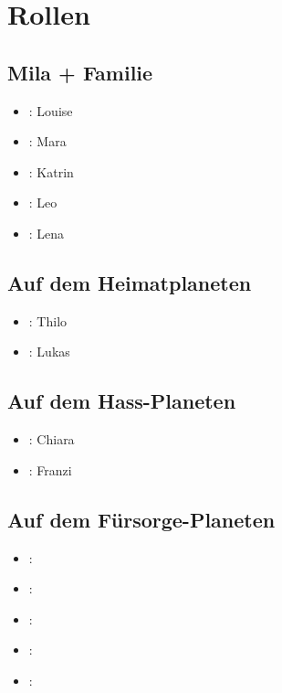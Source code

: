\pagebreak

\section{Rollen}
\begin{multicols}{2}
\subsection{Mila + Familie}
\begin{itemize}
\item \milamh: Louise
\item \miladh: Mara
\item \mutterh: Katrin
\item \leonh: Leo
\item \lenah: Lena
\end{itemize}

\subsection{Auf dem Heimatplaneten}
\begin{itemize}
\item \alberth: Thilo
\item \theoh: Lukas
\end{itemize}

\subsection{Auf dem Hass-Planeten}
\begin{itemize}
\item \wilmah: Chiara
\item \wilhelminah: Franzi
\end{itemize}

\subsection{Auf dem Fürsorge-Planeten}
\begin{itemize}
\item \charlotteh:
\item \sophiah:
\item \emmah:
\item \aaronh:
\item \cleoh:
\end{itemize}
\end{multicols}

\DisplayPersons

